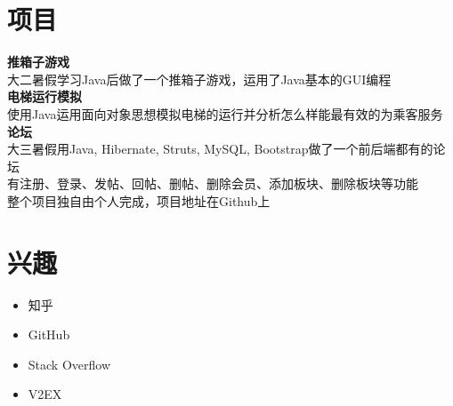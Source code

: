 \documentclass[11pt]{res}
\begin{document}
\begin{resume}
\section{项目}          
    {\bf 推箱子游戏}\\      
    大二暑假学习Java后做了一个推箱子游戏，运用了Java基本的GUI编程\\
    {\bf 电梯运行模拟}\\
    使用Java运用面向对象思想模拟电梯的运行并分析怎么样能最有效的为乘客服务\\
    {\bf 论坛}\\        
    大三暑假用Java, Hibernate, Struts, MySQL, Bootstrap做了一个前后端都有的论坛\\        
    有注册、登录、发帖、回帖、删帖、删除会员、添加板块、删除板块等功能\\
    整个项目独自由个人完成，项目地址在Github上

\section{兴趣}
  \begin{multicols}{2}
    \begin{itemize}
      \item 知乎
      \item GitHub
      \item Stack Overflow
      \item V2EX
    \end{itemize} 
  \end{multicols}

\end{resume}
\end{document}
